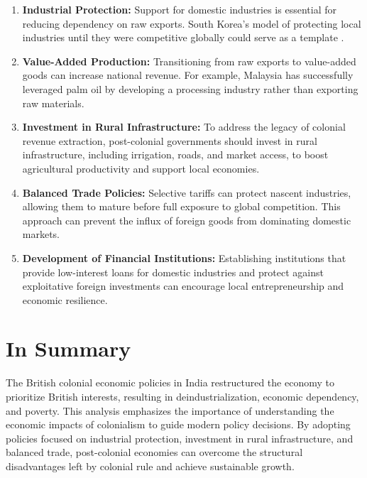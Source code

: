 \documentclass[9pt,twocolumn,twoside]{opticajnl}
\begin{document}
\begin{enumerate}
    \item \textbf{Industrial Protection:} Support for domestic industries is essential for reducing dependency on raw exports. South Korea’s model of protecting local industries until they were competitive globally could serve as a template \cite{chang2007bad}.
    
    \item \textbf{Value-Added Production:} Transitioning from raw exports to value-added goods can increase national revenue. For example, Malaysia has successfully leveraged palm oil by developing a processing industry rather than exporting raw materials.
    
    \item \textbf{Investment in Rural Infrastructure:} To address the legacy of colonial revenue extraction, post-colonial governments should invest in rural infrastructure, including irrigation, roads, and market access, to boost agricultural productivity and support local economies.
    
    \item \textbf{Balanced Trade Policies:} Selective tariffs can protect nascent industries, allowing them to mature before full exposure to global competition. This approach can prevent the influx of foreign goods from dominating domestic markets.
    
    \item \textbf{Development of Financial Institutions:} Establishing institutions that provide low-interest loans for domestic industries and protect against exploitative foreign investments can encourage local entrepreneurship and economic resilience.
\end{enumerate}

\section{In Summary}
The British colonial economic policies in India restructured the economy to prioritize British interests, resulting in deindustrialization, economic dependency, and poverty. This analysis emphasizes the importance of understanding the economic impacts of colonialism to guide modern policy decisions. By adopting policies focused on industrial protection, investment in rural infrastructure, and balanced trade, post-colonial economies can overcome the structural disadvantages left by colonial rule and achieve sustainable growth.
\end{document}
